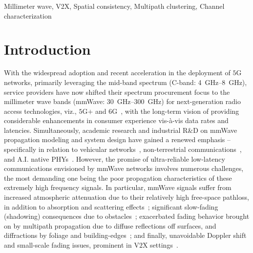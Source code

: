 \documentclass[12pt, draftcls, onecolumn]{IEEEtran}
\begin{document}
\begin{IEEEkeywords}
    \begin{center}
        Millimeter wave, V2X, Spatial consistency, Multipath clustering, Channel characterization
    \end{center}
\end{IEEEkeywords}
\vspace{-3mm}

\section{Introduction}\label{S1}
With the widespread adoption and recent acceleration in the deployment of $5$G networks, primarily leveraging the mid-band spectrum (C-band: \SIrange{4}{8}{\giga\hertz}), service providers have now shifted their spectrum procurement focus to the millimeter wave bands (mmWave: \SIrange{30}{300}{\giga\hertz}) for next-generation radio access technologies, viz., $5$G$+$ and $6$G~\cite{mmWaveSurvey, Commercial, 5GBSurvey, 6GSurvey}, with the long-term vision of providing considerable enhancements in consumer experience vis-\`{a}-vis data rates and latencies. Simultaneously, academic research and industrial R\&D on mmWave propagation modeling and system design have gained a renewed emphasis -- specifically in relation to vehicular networks~\cite{VehicularBeamSelection, CVBeamAlignmentV2X}, non-terrestrial communications~\cite{mmWaveRuralNTNOpportunities, UAVBeamTracking}, and A.I. native PHYs~\cite{6GAINative, OTAGANs}. However, the promise of ultra-reliable low-latency communications envisioned by mmWave networks involves numerous challenges, the most demanding one being the poor propagation characteristics of these extremely high frequency signals. In particular, mmWave signals suffer from increased atmospheric attenuation due to their relatively high free-space pathloss, in addition to absorption and scattering effects~\cite{Rappaport}; significant slow-fading (shadowing) consequences due to obstacles~\cite{SuburbanGeometryJournal}; exacerbated fading behavior brought on by multipath propagation due to diffuse reflections off surfaces, and diffractions by foliage and building-edges~\cite{Outdoor28G}; and finally, unavoidable Doppler shift and small-scale fading issues, prominent in V$2$X settings~\cite{V2XBlockages}.
\end{document}
